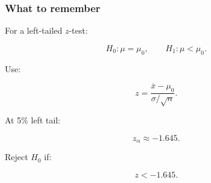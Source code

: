 \documentclass[10pt]{article}
\begin{document}
\subsubsection*{What to remember}
For a left-tailed \(z\)-test:

\[
H_0:\mu=\mu_0,
\qquad
H_1:\mu<\mu_0.
\]

Use:

\[
z=
\frac{\bar{x}-\mu_0}
{\sigma/\sqrt{n}}.
\]

At 5\% left tail:

\[
z_\alpha\approx -1.645.
\]

Reject \(H_0\) if:

\[
z<-1.645.
\]
\end{document}
